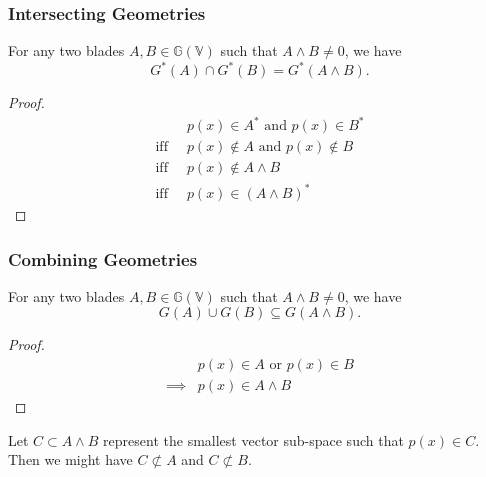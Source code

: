 \documentclass{beamer}
\newcommand{\G}{\mathbb{G}}
\newcommand{\V}{\mathbb{V}}
\begin{document}
\begin{frame}
\frametitle{Intersecting Geometries}
\begin{lemma}
For any two blades $A,B\in\G(\V)$ such that $A\wedge B\neq 0$,
we have
\begin{equation*}
G^*(A)\cap G^*(B)=G^*(A\wedge B).
\end{equation*}
\end{lemma}
\begin{proof}
\begin{align*}
 & \mbox{$p(x)\in A^*$ and $p(x)\in B^*$} \\
\mbox{iff}\;\; & \mbox{$p(x)\not\in A$ and $p(x)\not\in B$} \\
\mbox{iff}\;\; & \mbox{$p(x)\not\in A\wedge B$} \\
\mbox{iff}\;\; & \mbox{$p(x)\in(A\wedge B)^*$}
\end{align*}
\end{proof}
\end{frame}

\begin{frame}
\frametitle{Combining Geometries}
\begin{lemma}
For any two blades $A,B\in\G(\V)$ such that $A\wedge B\neq 0$, we have
\begin{equation*}
G(A)\cup G(B)\subseteq G(A\wedge B).
\end{equation*}
\end{lemma}
\begin{proof}
\begin{align*}
 & \mbox{$p(x)\in A$ or $p(x)\in B$} \\
\implies & \mbox{$p(x)\in A\wedge B$}
\end{align*}
\end{proof}
Let $C\subset A\wedge B$ represent the smallest vector sub-space such that $p(x)\in C$.
Then we might have $C\not\subset A$ and $C\not\subset B$.
\end{frame}

\end{document}
